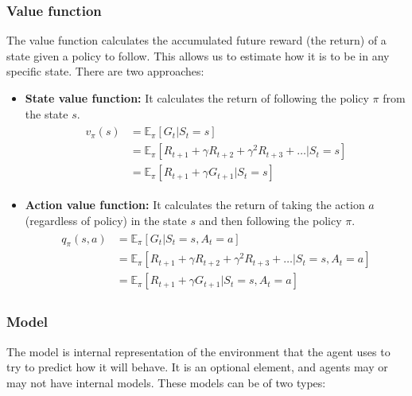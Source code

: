 \subsubsection*{Value function}

The value function calculates the accumulated future reward (the return) of a state given a policy to follow. This allows us to estimate how  it is to be in any specific state. There are two approaches:

\begin{itemize}
    \item \textbf{State value function:} It calculates the return of following the policy $\pi$ from the state $s$.
    \begin{align}
    \begin{split}
        v_\pi(s) &= \mathbb{E}_\pi[G_t|S_t = s]\\
        &= \mathbb{E}_\pi[R_{t+1} + \gamma R_{t+2} + \gamma^2R_{t+3} + \ldots|S_t = s]\\
        &= \mathbb{E}_\pi[R_{t+1} + \gamma G_{t+1}|S_t = s]
    \end{split}
    \end{align}
    \item \textbf{Action value function:} It calculates the return of taking the action $a$ (regardless of policy) in the state $s$ and then following the policy $\pi$.
    \begin{align}
    \begin{split}
        q_\pi(s,a) &= \mathbb{E}_\pi[G_t |S_t = s,A_t = a]\\
        &= \mathbb{E}_\pi[R_{t+1} + \gamma R_{t+2} + \gamma^2R_{t+3} + \ldots|S_t = s,A_t = a]\\
        &= \mathbb{E}_\pi[R_{t+1} + \gamma G_{t+1}|S_t = s,A_t = a]
    \end{split}
    \end{align}
\end{itemize}

\subsubsection*{Model}

The model is internal representation of the environment that the agent uses to try to predict how it will behave. It is an optional element, and agents may or may not have internal models. These models can be of two types:

